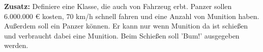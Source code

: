 \begin{frame}
	\textbf{Zusatz:} Definiere eine  Klasse, die auch von Fahrzeug erbt. Panzer sollen 6.000.000 € kosten, 70 km/h schnell fahren und eine Anzahl von Munition haben. Außerdem soll ein Panzer  können. Er kann nur wenn Munition da ist schießen und verbraucht dabei eine Munition. Beim Schießen soll 'Bum!' ausgegeben werden.
\end{frame}


